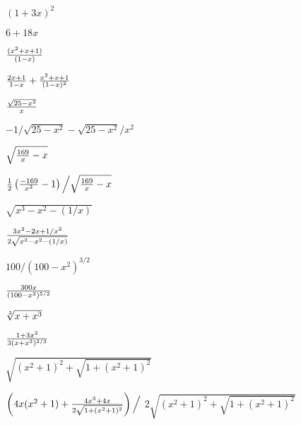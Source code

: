 \begin{exercises}
\begin{exercise} $(1+3x)^2$
\begin{answer} $ 6+18x$
\end{answer}\end{exercise}

\begin{exercise} ${(x^2+x+1)\over(1-x)}$
\begin{answer} ${2 x + 1\over1 - x }+{x^2  + x + 1\over(1 - x)^2}$
\end{answer}\end{exercise}

\begin{exercise} ${\sqrt{25-x^2}\over x}$
\begin{answer} $ -1/\sqrt{25-x^2}-\sqrt{25-x^2}/x^2$
\end{answer}\end{exercise}

\begin{exercise} $\sqrt{{169\over x}-x}$
\begin{answer} ${1\over2}\left({-169\over x^2}-1\right)\Big/\sqrt{{169\over x}-x}$
\end{answer}\end{exercise}

\begin{exercise} $\sqrt{x^3-x^2-(1/x)}$
\begin{answer} $ {3x^2-2x+1/x^2\over 2\sqrt{x^3-x^2-(1/x)}}$
\end{answer}\end{exercise}

\begin{exercise} $100/(100-x^2)^{3/2}$
\begin{answer} $ {300 x \over(100-x^2)^{5/2}}$
\end{answer}\end{exercise}

\begin{exercise} ${\root 3 \of{x+x^3}}$
\begin{answer} $ { 1 + 3 x^2\over3(x+x^3)^{2/3}}$
\end{answer}\end{exercise}

\begin{exercise} $\sqrt{(x^2+1)^2+\sqrt{1+(x^2+1)^2}}$
\begin{answer} $ \left(4x(x^2+1)+{4x^3+4x\over2\sqrt{1+(x^2+1)^2}}\right)\Big/$
\hfill\break$2\sqrt{(x^2+1)^2+\sqrt{1+(x^2+1)^2}}$
\end{answer}\end{exercise}


\end{exercises}
